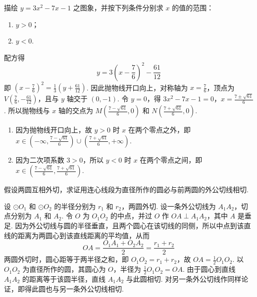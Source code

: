 \documentclass[UTF8,a4paper,oneside,11pt]{ctexbook}
\begin{document}
\begin{problem}
描绘 \(y=3x^{2}-7x-1\) 之图象，并按下列条件分别求 \(x\) 的值的范围：

\begin{enumerate}
\item \(y>0\)；
\item \(y<0\).
\end{enumerate}
\end{problem}

\begin{solution}
配方得
\[
y=3\left(x-\frac{7}{6}\right)^{2}-\frac{61}{12}
\]
即 \(\left(x-\frac{7}{6}\right)^{2}=\frac{1}{3}\left(y+\frac{61}{12}\right)\). 因此抛物线开口向上，对称轴为 \(x=\frac{7}{6}\)，顶点为 \(V\left(\frac{7}{6},-\frac{61}{12}\right)\)，且与 \(y\) 轴交于 \((0,-1)\). 令 \(y=0\)，得
\(3x^{2}-7x-1=0\)，\(x=\frac{7\pm\sqrt{61}}{6}\).
所以抛物线与 \(x\) 轴的交点为 \(M\left(\frac{7-\sqrt{61}}{6},0\right)\) 和 \(N\left(\frac{7+\sqrt{61}}{6},0\right)\).

\begin{enumerate}
\item 因为抛物线开口向上，故 \(y>0\) 时 \(x\) 在两个零点之外，即 \(x\in\left(-\infty,\frac{7-\sqrt{61}}{6}\right)\cup\left(\frac{7+\sqrt{61}}{6},+\infty\right)\).

\item 因为二次项系数 \(3>0\)，所以 \(y<0\) 时 \(x\) 在两个零点之间，即 \(x\in\left(\frac{7-\sqrt{61}}{6},\frac{7+\sqrt{61}}{6}\right)\).
\end{enumerate}

\end{solution}

\begin{problem}
假设两圆互相外切，求证用连心线段为直径所作的圆必与前两圆的外公切线相切.
\end{problem}

\begin{solution}
设 \(\odot O_{1}\) 和 \(\odot O_{2}\) 的半径分别为 \(r_{1}\) 和 \(r_{2}\)，两圆外切. 设一条外公切线为 \(A_{1}A_{2}\)，切点分别为 \(A_{1}\) 和 \(A_{2}\). 令 \(O\) 为 \(O_{1}O_{2}\) 的中点，并过 \(O\) 作 \(OA\perp A_{1}A_{2}\)，其中 \(A\) 是垂足. 因为外公切线与圆的半径垂直，且两个圆心在该切线的同侧，所以中点到该直线的距离为两圆心到该直线距离的平均值，从而
\[
OA=\frac{O_{1}A_{1}+O_{2}A_{2}}{2}=\frac{r_{1}+r_{2}}{2}
\]
两圆外切时，圆心距等于两半径之和，即 \(O_{1}O_{2}=r_{1}+r_{2}\)，故 \(OA=\frac{1}{2}O_{1}O_{2}\). 以 \(O_{1}O_{2}\) 为直径所作的圆，其圆心为 \(O\)，半径为 \(\frac{1}{2}O_{1}O_{2}=OA\). 由于圆心到直线 \(A_{1}A_{2}\) 的距离等于该圆半径，直线 \(A_{1}A_{2}\) 与此圆相切. 对另一条外公切线作同样论证，即得此圆也与另一条外公切线相切.

\end{solution}
\end{document}
